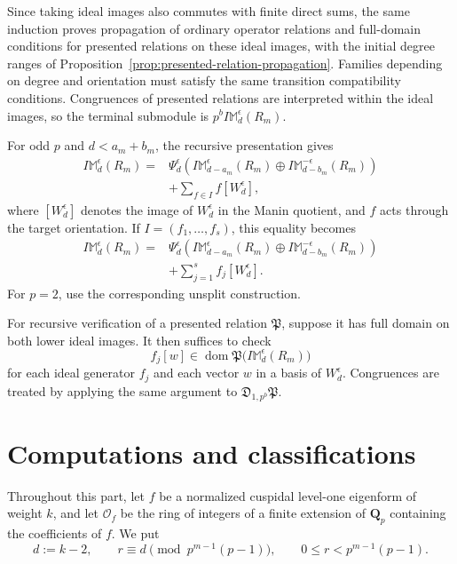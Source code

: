 \documentclass[11pt]{article}
\newcommand{\Q}{\mathbf Q}
\newcommand{\cO}{\mathcal O}
\theoremstyle{plain}
\theoremstyle{definition}
\theoremstyle{remark}
\numberwithin{equation}{section}
\begin{document}
Since taking ideal images also commutes with finite direct sums, the same induction proves propagation of ordinary operator relations and full-domain conditions for presented relations on these ideal images, with the initial degree ranges of Proposition~\ref{prop:presented-relation-propagation}. Families depending on degree and orientation must satisfy the same transition compatibility conditions. Congruences of presented relations are interpreted within the ideal images, so the terminal submodule is \(p^bI\mathbb M_d^\epsilon(R_m)\). 

For odd \(p\) and \(d<a_m+b_m\), the recursive presentation gives \[ \begin{aligned} I\mathbb M_d^\epsilon(R_m) ={}& \Psi_d^\epsilon\left( I\mathbb M_{d-a_m}^\epsilon(R_m) \oplus I\mathbb M_{d-b_m}^{-\epsilon}(R_m) \right)\\ &+\sum_{f\in I}f[W_d^\epsilon], \end{aligned} \] where \([W_d^\epsilon]\) denotes the image of \(W_d^\epsilon\) in the Manin quotient, and \(f\) acts through the target orientation. If \(I=(f_1,\ldots,f_s)\), this equality becomes \[ \begin{aligned} I\mathbb M_d^\epsilon(R_m) ={}& \Psi_d^\epsilon\left( I\mathbb M_{d-a_m}^\epsilon(R_m) \oplus I\mathbb M_{d-b_m}^{-\epsilon}(R_m) \right)\\ &+\sum_{j=1}^s f_j[W_d^\epsilon]. \end{aligned} \] For \(p=2\), use the corresponding unsplit construction.

For recursive verification of a presented relation \(\mathfrak P\), suppose it has full domain on both lower ideal images. It then suffices to check \[ f_j[w]\in \operatorname{dom}\mathfrak P \bigl(I\mathbb M_d^\epsilon(R_m)\bigr) \] for each ideal generator \(f_j\) and each vector \(w\) in a basis of \(W_d^\epsilon\). Congruences are treated by applying the same argument to \(\mathfrak D_{1,p^b}\mathfrak P\).

\part{Computations and classifications}

Throughout this part, let \(f\) be a normalized cuspidal level-one eigenform of weight \(k\), and let \(\cO_f\) be the ring of integers of a finite extension of $\Q_p$ containing the coefficients of \(f\). We put
\[d:=k-2, \qquad r\equiv d\pmod{p^{m-1}(p-1)}, \qquad 0 \leq r < p^{m-1}(p-1).\]
\end{document}
